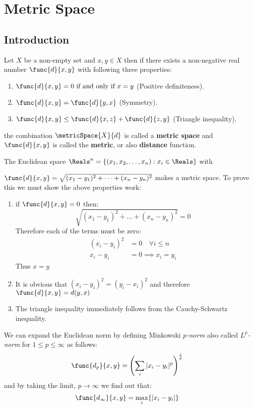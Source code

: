 
\thispagestyle{headings}
\chapter{Metric Space}
\section{Introduction}

Let \(X\) be a non-empty set and \(x,y \in X\) then if there exists a non-negative real number \(\func{d}{x,y}\) with following three properties:
\begin{enumerate}
    \item \(\func{d}{x,y} = 0 \text{ if and only if } x = y\) (Positive definiteness).
    \item \(\func{d}{x,y} = \func{d}{y,x}\) (Symmetry).
    \item \(\func{d}{x,y} \leq \func{d}{x,z} + \func{d}{z,y}\) (Triangle inequality).
\end{enumerate}
the combination \(\metricSpace{X}{d}\) is called a \textbf{metric space} and \(\func{d}{x,y}\) is called the \textbf{metric}, or also \textbf{distance} function.
\begin{example}
    The Euclidean space \(\Reals^n = \{(x_1,x_2,\dots,x_n) : x_i \in \Reals\}\) with \raggedright \(\func{d}{x,y}=\sqrt{(x_1-y_1)^2 + \dots + (x_n - y_n)^2} \) makes a metric space. To prove this we must show the above properties work:
    \begin{enumerate}
        \item if \(\func{d}{x,y} = 0\) then:
              \[ \sqrt{(x_1-y_1)^2 + \dots + (x_n - y_n)^2} = 0 \]
              Therefore each of the terms must be zero:
              \begin{align*}
                  (x_i - y_i)^2 & = 0 \quad  \forall i \leq n \\
                  x_i - y_i     & = 0 \implies x_i = y_i
              \end{align*}
              Thus \(x = y\)
        \item  It is obvious that \((x_i - y_i)^2 = (y_i - x_i)^2\) and therefore \(\func{d}{x,y} = d(y,x)\)
        \item  The triangle inequality immediately follows from the Cauchy-Schwartz inequality.
    \end{enumerate}
\end{example}

We can expand the Euclidean norm by defining Minkowski \textit{\(p\)-norm} also called \textit{\(L^p\)-norm} for \(1 \leq p \leq \infty\) as follows:
\[\func{d_p}{x,y} = \left(\sum_{i}{|x_i - y_i|^p}\right)^{\frac{1}{p}}\]
and by taking the limit, \(p \to \infty\) we find out that:
\[\func{d_\infty}{x,y} = \max_{i} \{|x_i - y_i|\}\]

